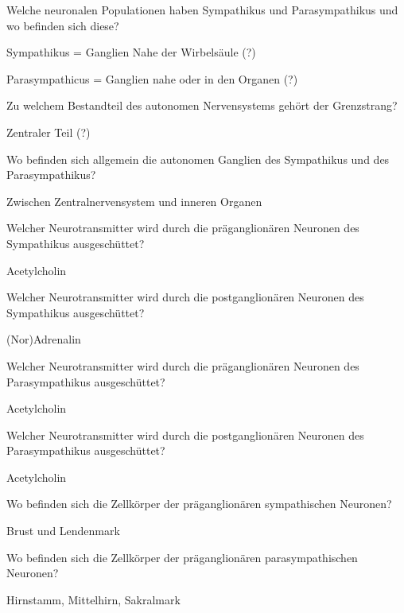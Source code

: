 \documentclass[10pt, a4paper]{exam}
\begin{document}
\begin{questions}
  \question Welche neuronalen Populationen haben Sympathikus und Parasympathikus und wo befinden sich diese?
  \begin{solution}
    \begin{itemize*}
      \item Sympathikus = Ganglien Nahe der Wirbelsäule (?)
      \item Parasympathicus = Ganglien nahe oder in den Organen (?)
    \end{itemize*}
  \end{solution}

  \question Zu welchem Bestandteil des autonomen Nervensystems gehört der Grenzstrang?
  \begin{solution}
    Zentraler Teil (?)
  \end{solution}

  \question Wo befinden sich allgemein die autonomen Ganglien des Sympathikus und des Parasympathikus?
  \begin{solution}
    Zwischen Zentralnervensystem und inneren Organen
  \end{solution}

  \question Welcher Neurotransmitter wird durch die präganglionären Neuronen des Sympathikus ausgeschüttet?
  \begin{solution}
    Acetylcholin
  \end{solution}

  \question Welcher Neurotransmitter wird durch die postganglionären Neuronen des Sympathikus ausgeschüttet?
  \begin{solution}
    (Nor)Adrenalin
  \end{solution}

  \question Welcher Neurotransmitter wird durch die präganglionären Neuronen des Parasympathikus ausgeschüttet?
  \begin{solution}
    Acetylcholin
  \end{solution}

  \question Welcher Neurotransmitter wird durch die postganglionären Neuronen des Parasympathikus ausgeschüttet?
  \begin{solution}
    Acetylcholin
  \end{solution}

  \question Wo befinden sich die Zellkörper der präganglionären sympathischen Neuronen?
  \begin{solution}
    Brust und Lendenmark
  \end{solution}

  \question Wo befinden sich die Zellkörper der präganglionären parasympathischen Neuronen?
  \begin{solution}
    Hirnstamm, Mittelhirn, Sakralmark
  \end{solution}


\end{questions}
\end{document}
